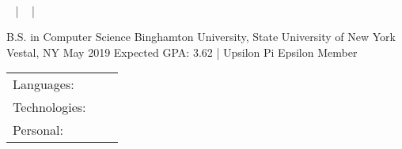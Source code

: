 \documentclass[]{awesome-cv}
\begin{document}
\begin{center}
	\ \ \  \\
	\vspace{2mm}
	{\faEnvelope\ } | {\faPhone\ } | {\faLink\ }
\end{center}

\begin{cventries}
	\cventry
	{B.S. in Computer Science}
	{Binghamton University, State University of New York}
	{Vestal, NY}
	{May 2019 Expected}
	{GPA: 3.62 | Upsilon Pi Epsilon Member}
\end{cventries}
\vspace{-2mm}

\begin{cventries}
	\cventry
	{}
	{\def\arraystretch{1.15}{\begin{tabular}{ l l }
		Languages:  & \ \ \skill{{ Python, C++, C, Java, HTML, CSS}} \\
		Technologies:  & \ \ \skill{{ MacOS, Linux, Windows, Git, Vim}} \\
		Personal:  & \ \ \skill{{ Communication, organization, teamwork, leadership, critical thinking}} \\
	\end{tabular}}}
	{}
	{}
	{}
\end{cventries}
\vspace{-9mm}
\end{document}
